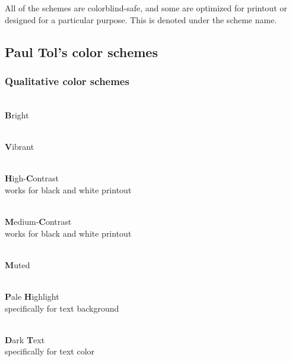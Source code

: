\documentclass{scrartcl}
\begin{document}
All of the schemes are colorblind-safe, and some are optimized for printout or designed for a particular purpose.
This is denoted under the scheme name.\clearpage

\subsection{Paul Tol's color schemes}\label{sec:Tol_schemes}

\subsubsection{Qualitative color schemes}\label{sec:T-Q}
\begin{minipage}{0.5\textwidth}
	\centering
	\\
	\textbf{B}right\\
	\phantom{pb}
\end{minipage}\hfill%
\begin{minipage}{0.5\textwidth}
	\centering
	\\
	\textbf{V}ibrant
\end{minipage}

\begin{minipage}{0.5\textwidth}
	\centering
	\\
	\textbf{H}igh-\textbf{C}ontrast\\
	works for black and white printout
\end{minipage}\hfill%
\begin{minipage}{0.5\textwidth}
	\centering
	\\
	\textbf{M}edium-\textbf{C}ontrast\\
	works for black and white printout
\end{minipage}

\begin{center}
	\\
	\textbf{M}uted
\end{center}

\begin{minipage}{0.5\textwidth}
	\centering
	\\
	\textbf{P}ale \textbf{H}ighlight\\
	specifically for text background
\end{minipage}\hfill%
\begin{minipage}{0.5\textwidth}
	\centering
	\\
	\textbf{D}ark \textbf{T}ext\\
	specifically for text color
\end{minipage}
\end{document}
